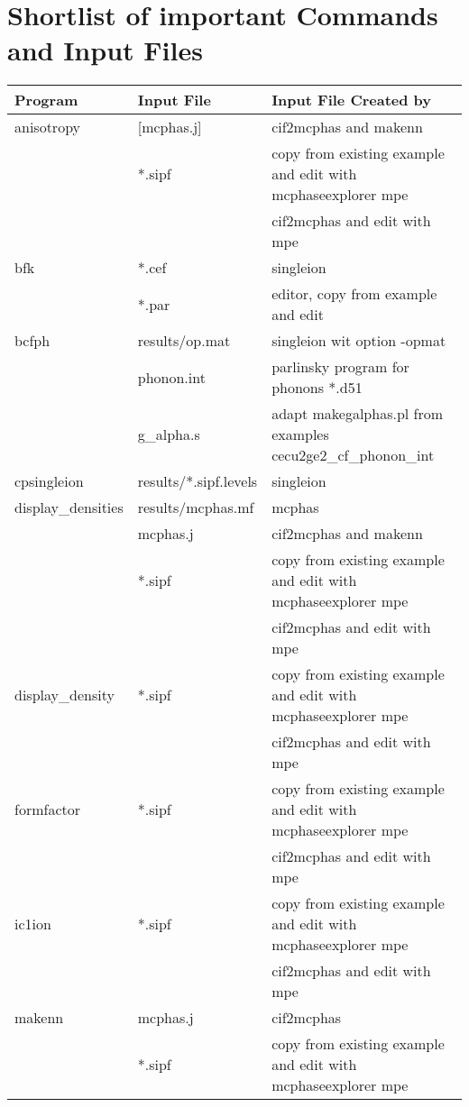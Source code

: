 \section{Shortlist of important Commands and Input Files}\label{shortlist}
\small

\begin{table}
\label{tab:shortlist}
\begin{tabular}{lll}
\hline
Program	&	Input File	&	Input File Created by \\
\hline
anisotropy & 	[mcphas.j]	&	cif2mcphas and makenn \\
		&	*.sipf		&	copy from existing example and edit with mcphaseexplorer mpe \\
		&			&	cif2mcphas and edit with mpe \\	
bfk		&	*.cef		&     singleion \\
		&      *.par           &    editor, copy from example and edit \\	
bcfph          &  results/op.mat  & singleion wit option  -opmat  \\
                &   phonon.int     &     parlinsky program for phonons *.d51 \\
                &  g\_alpha.s      &  adapt makegalphas.pl from examples cecu2ge2\_cf\_phonon\_int \\  
cpsingleion	&	results/*.sipf.levels &	singleion \\
display\_densities &	results/mcphas.mf &	mcphas \\	
		&	mcphas.j	&	cif2mcphas and makenn \\
		&	*.sipf		&	copy from existing example and edit with mcphaseexplorer mpe \\
		&			&	cif2mcphas and edit with mpe \\		
display\_density &	*.sipf		&	copy from existing example and edit with mcphaseexplorer mpe \\
		&			&	cif2mcphas and edit with mpe \\
formfactor	&	*.sipf		&	copy from existing example and edit with mcphaseexplorer mpe \\
		&			&	cif2mcphas and edit with mpe \\	
ic1ion		&	*.sipf		&	copy from existing example and edit with mcphaseexplorer mpe \\
		&			&	cif2mcphas and edit with mpe \\
makenn		&	mcphas.j	&	cif2mcphas\\
		&	*.sipf		&	copy from existing example and edit with mcphaseexplorer mpe \\

\end{tabular}
\end{table}

